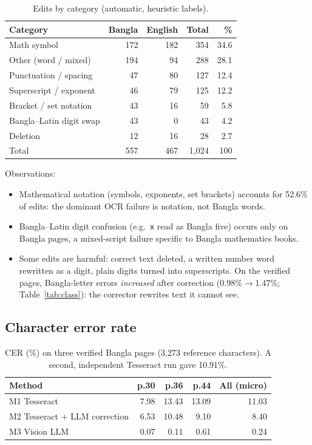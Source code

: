 \documentclass[11pt]{article}
\begin{document}
\begin{table}[h]
\centering
\begin{tabular}{lrrrr}
\toprule
Category & Bangla & English & Total & \% \\
\midrule
Math symbol & 172 & 182 & 354 & 34.6 \\
Other (word / mixed) & 194 & 94 & 288 & 28.1 \\
Punctuation / spacing & 47 & 80 & 127 & 12.4 \\
Superscript / exponent & 46 & 79 & 125 & 12.2 \\
Bracket / set notation & 43 & 16 & 59 & 5.8 \\
Bangla--Latin digit swap & 43 & 0 & 43 & 4.2 \\
Deletion & 12 & 16 & 28 & 2.7 \\
\midrule
Total & 557 & 467 & 1{,}024 & 100 \\
\bottomrule
\end{tabular}
\caption{Edits by category (automatic, heuristic labels).}
\label{tab:categories}
\end{table}

Observations:
\begin{itemize}
  \item Mathematical notation (symbols, exponents, set brackets) accounts for
        52.6\% of edits: the dominant OCR failure is notation, not Bangla words.
  \item Bangla--Latin digit confusion (e.g.\ \texttt{x} read as Bangla five)
        occurs only on Bangla pages, a mixed-script failure specific to
        Bangla mathematics books.
  \item Some edits are harmful: correct text deleted, a written number word
        rewritten as a digit, plain digits turned into superscripts.
        On the verified pages, Bangla-letter errors \emph{increased} after
        correction (0.98\%$\rightarrow$1.47\%; Table~\ref{tab:class}): the
        corrector rewrites text it cannot see.
\end{itemize}

\subsection{Character error rate}
\begin{table}[h]
\centering
\begin{tabular}{lrrrr}
\toprule
Method & p.30 & p.36 & p.44 & All (micro) \\
\midrule
M1 Tesseract & 7.98 & 13.43 & 13.09 & 11.03 \\
M2 Tesseract + LLM correction & 6.53 & 10.48 & 9.10 & 8.40 \\
M3 Vision LLM & 0.07 & 0.11 & 0.61 & 0.24 \\
\bottomrule
\end{tabular}
\caption{CER (\%) on three verified Bangla pages (3{,}273 reference characters).
A second, independent Tesseract run gave 10.91\%.}
\label{tab:cer}
\end{table}
\end{document}
